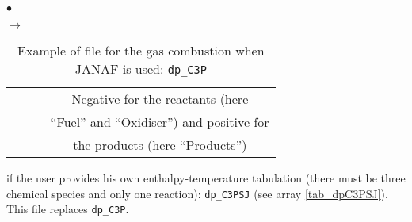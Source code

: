 {{{\begin{list}{$\bullet$}{}
\begin{list}{$\rightarrow$}{}
\begin{table}[htbp]
\begin{center}
{\begin{tabular}{|c|c|c|c|}
        &                   &                               & Negative for the reactants (here                \\
        &                   &                               & ``Fuel'' and ``Oxidiser'') and positive for      \\
        &                   &                               & the products (here ``Products'')                \\ \hline
\end{tabular}
}
\caption{Example of file for the gas combustion when JANAF is used: \texttt{dp\_C3P}}\label{tab_dpC3P}
\end{center}
\end{table}

               \item if the user provides his own enthalpy-temperature tabulation
                     (there must be three chemical species and only
                     one reaction): \texttt{dp\_C3PSJ} (see
                     array \ref{tab_dpC3PSJ}). This file replaces \texttt{dp\_C3P}.


\end{list}
\end{list}}}}
